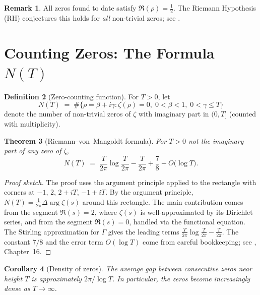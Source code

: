 \documentclass[12pt,a4paper]{amsart}
\newtheorem{theorem}{Theorem}[section]
\newtheorem{corollary}[theorem]{Corollary}
\theoremstyle{definition}
\newtheorem{definition}[theorem]{Definition}
\newtheorem{remark}[theorem]{Remark}
\begin{document}
\begin{remark}
All zeros found to date satisfy $\Re(\rho) = \tfrac{1}{2}$.
The Riemann Hypothesis (RH) conjectures this holds for \emph{all} non-trivial
zeros; see \cite{Riemann1859}.
\end{remark}

\section{Counting Zeros: The Formula \texorpdfstring{$N(T)$}{N(T)}}

\begin{definition}[Zero-counting function]
\label{def:NT}
For $T > 0$, let
\[
  N(T) \;=\; \#\bigl\{\rho = \beta + i\gamma : \zeta(\rho) = 0,\;
  0 < \beta < 1,\; 0 < \gamma \le T\bigr\}
\]
denote the number of non-trivial zeros of $\zeta$ with imaginary part
in $(0, T]$ (counted with multiplicity).
\end{definition}

\begin{theorem}[Riemann--von~Mangoldt formula]
\label{thm:NT}
For $T > 0$ not the imaginary part of any zero of $\zeta$,
\begin{equation}
  \label{eq:NT}
  N(T) \;=\; \frac{T}{2\pi}\log\frac{T}{2\pi} - \frac{T}{2\pi}
            + \frac{7}{8} + O\!\bigl(\log T\bigr).
\end{equation}
\end{theorem}

\begin{proof}[Proof sketch]
The proof uses the argument principle applied to the rectangle with
corners at $-1$, $2$, $2+iT$, $-1+iT$.  By the argument principle,
$N(T) = \tfrac{1}{2\pi}\Delta\arg\zeta(s)$ around this rectangle.
The main contribution comes from the segment $\Re(s) = 2$, where
$\zeta(s)$ is well-approximated by its Dirichlet series, and from the
segment $\Re(s) = 0$, handled via the functional equation.
The Stirling approximation for $\Gamma$ gives the leading terms
$\frac{T}{2\pi}\log\frac{T}{2\pi} - \frac{T}{2\pi}$.
The constant $7/8$ and the error term $O(\log T)$ come from careful
bookkeeping; see \cite{Davenport2000}, Chapter~16.
\end{proof}

\begin{corollary}[Density of zeros]
The average gap between consecutive zeros near height $T$ is approximately
$2\pi/\log T$.  In particular, the zeros become increasingly dense as
$T \to \infty$.
\end{corollary}
\end{document}
